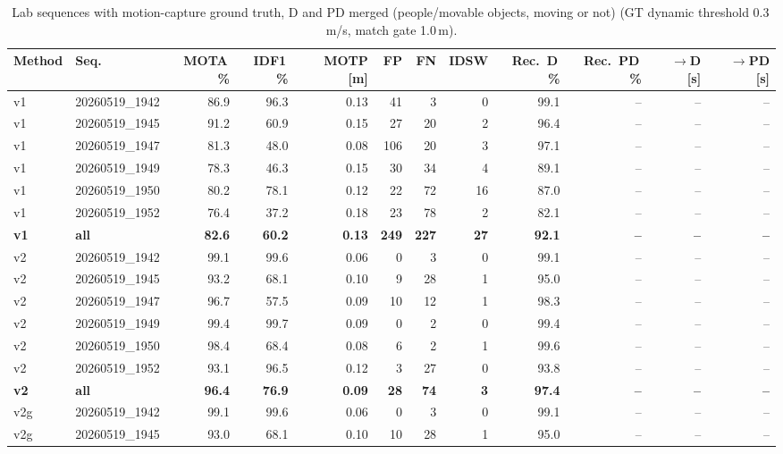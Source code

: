 \begin{table}[t]
\centering
\caption{Lab sequences with motion-capture ground truth, D and PD merged (people/movable objects, moving or not) (GT dynamic threshold 0.3\,m/s, match gate 1.0\,m).}
\label{tab:own_r8a_merged}
\setlength{\tabcolsep}{3pt}
\begin{tabular}{llrrrrrrrrrr}
\toprule
Method & Seq. & MOTA\,\% & IDF1\,\% & MOTP [m] & FP & FN & IDSW & Rec.\ D\,\% & Rec.\ PD\,\% & $\to$D [s] & $\to$PD [s] \\
\midrule
v1 & 20260519\_1942 & 86.9 & 96.3 & 0.13 & 41 & 3 & 0 & 99.1 & -- & -- & -- \\
v1 & 20260519\_1945 & 91.2 & 60.9 & 0.15 & 27 & 20 & 2 & 96.4 & -- & -- & -- \\
v1 & 20260519\_1947 & 81.3 & 48.0 & 0.08 & 106 & 20 & 3 & 97.1 & -- & -- & -- \\
v1 & 20260519\_1949 & 78.3 & 46.3 & 0.15 & 30 & 34 & 4 & 89.1 & -- & -- & -- \\
v1 & 20260519\_1950 & 80.2 & 78.1 & 0.12 & 22 & 72 & 16 & 87.0 & -- & -- & -- \\
v1 & 20260519\_1952 & 76.4 & 37.2 & 0.18 & 23 & 78 & 2 & 82.1 & -- & -- & -- \\
\textbf{v1} & \textbf{all} & \textbf{82.6} & \textbf{60.2} & \textbf{0.13} & \textbf{249} & \textbf{227} & \textbf{27} & \textbf{92.1} & \textbf{--} & \textbf{--} & \textbf{--} \\
\midrule
v2 & 20260519\_1942 & 99.1 & 99.6 & 0.06 & 0 & 3 & 0 & 99.1 & -- & -- & -- \\
v2 & 20260519\_1945 & 93.2 & 68.1 & 0.10 & 9 & 28 & 1 & 95.0 & -- & -- & -- \\
v2 & 20260519\_1947 & 96.7 & 57.5 & 0.09 & 10 & 12 & 1 & 98.3 & -- & -- & -- \\
v2 & 20260519\_1949 & 99.4 & 99.7 & 0.09 & 0 & 2 & 0 & 99.4 & -- & -- & -- \\
v2 & 20260519\_1950 & 98.4 & 68.4 & 0.08 & 6 & 2 & 1 & 99.6 & -- & -- & -- \\
v2 & 20260519\_1952 & 93.1 & 96.5 & 0.12 & 3 & 27 & 0 & 93.8 & -- & -- & -- \\
\textbf{v2} & \textbf{all} & \textbf{96.4} & \textbf{76.9} & \textbf{0.09} & \textbf{28} & \textbf{74} & \textbf{3} & \textbf{97.4} & \textbf{--} & \textbf{--} & \textbf{--} \\
\midrule
v2g & 20260519\_1942 & 99.1 & 99.6 & 0.06 & 0 & 3 & 0 & 99.1 & -- & -- & -- \\
v2g & 20260519\_1945 & 93.0 & 68.1 & 0.10 & 10 & 28 & 1 & 95.0 & -- & -- & -- \\

\end{tabular}
\end{table}
